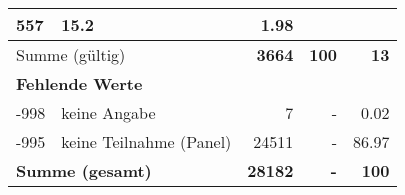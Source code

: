 \begin{longtable}{lXrrr}
       \num{557} &
       \num[round-mode=places,round-precision=2]{15.2} &
         \num[round-mode=places,round-precision=2]{1.98} \\
     \midrule
     \multicolumn{2}{l}{Summe (gültig)} &
       \textbf{\num{3664}} &
     \textbf{\num{100}} &
       \textbf{\num[round-mode=places,round-precision=2]{13}} \\
     \multicolumn{5}{l}{\textbf{Fehlende Werte}}\\
       -998 &
       keine Angabe &
         \num{7} &
        - &
         \num[round-mode=places,round-precision=2]{0.02} \\
       -995 &
       keine Teilnahme (Panel) &
         \num{24511} &
        - &
         \num[round-mode=places,round-precision=2]{86.97} \\
     \midrule
     \multicolumn{2}{l}{\textbf{Summe (gesamt)}} &
          \textbf{\num{28182}} &
        \textbf{-} &
        \textbf{\num{100}} \\
     \bottomrule
     \end{longtable}
     
